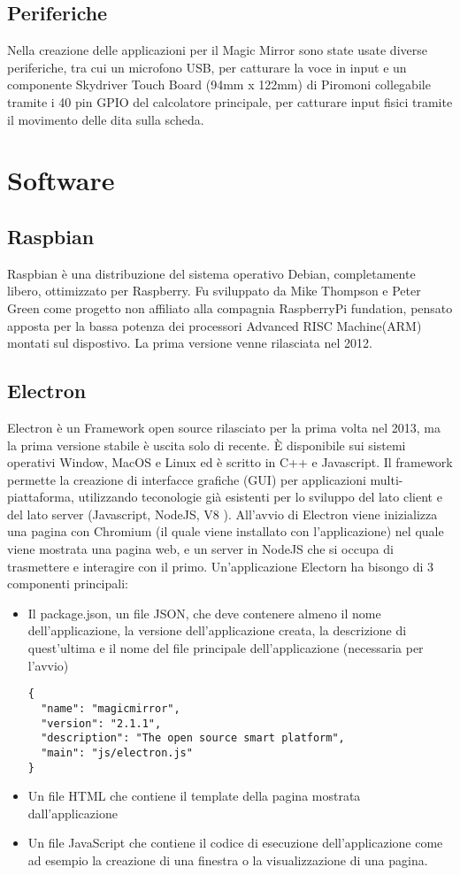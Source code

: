 \subsection{Periferiche}
Nella creazione delle applicazioni per il Magic Mirror sono state usate diverse periferiche, tra cui un microfono
USB, per catturare la voce in input e un componente Skydriver Touch Board (94mm x 122mm) di Piromoni collegabile tramite
i 40 pin GPIO del calcolatore principale, per catturare input fisici tramite il movimento delle dita sulla scheda.

\section{Software}
\subsection{Raspbian}
Raspbian \`e una distribuzione del sistema operativo Debian, completamente libero,
ottimizzato per Raspberry.
Fu sviluppato da Mike Thompson e Peter Green come progetto non affiliato alla compagnia RaspberryPi
fundation, pensato apposta per la bassa potenza dei processori Advanced RISC Machine(ARM) montati sul
dispostivo.
La prima versione venne rilasciata nel 2012.

\subsection{Electron}
Electron \`e un Framework open source rilasciato per la prima volta nel 2013, ma la prima versione
stabile \`e uscita solo di recente. \`E disponibile sui sistemi operativi Window, MacOS e Linux ed \`e scritto
in C++ e Javascript. Il framework permette la creazione di interfacce grafiche (GUI) per
applicazioni multi-piattaforma, utilizzando teconologie gi\`a esistenti per lo sviluppo
del lato client e del lato server (Javascript, NodeJS, V8 \cite{V8}).
All'avvio di Electron viene inizializza una pagina con Chromium \cite{Chromium}(il quale viene installato con l'applicazione)
nel quale viene mostrata una pagina web, e un server in NodeJS che si occupa di trasmettere e interagire con il primo.
Un'applicazione Electorn ha bisongo di 3 componenti principali:
\begin{itemize}
\item Il package.json, un file JSON, che deve contenere almeno il nome dell'applicazione,
la versione dell'applicazione creata, la descrizione di quest'ultima e il
 nome del file principale dell'applicazione (necessaria per l'avvio)
\begin{lstlisting}
{
  "name": "magicmirror",
  "version": "2.1.1",
  "description": "The open source smart platform",
  "main": "js/electron.js"
}
\end{lstlisting}
\item Un file HTML che contiene il template della pagina mostrata dall'applicazione
\item Un file JavaScript che contiene il codice di esecuzione dell'applicazione come ad esempio la
creazione di una finestra o la visualizzazione di una pagina.
\end{itemize}

